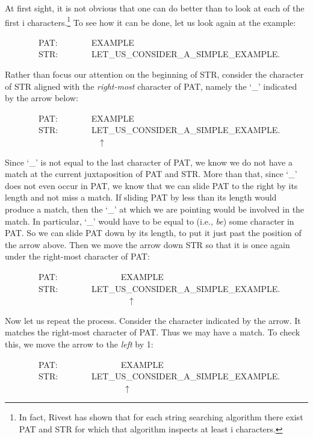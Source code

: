 \documentclass[10pt]{book}
\newenvironment{pubasis}{\begin{flushleft}}{\end{flushleft}}
\begin{document}
At first sight, it is not obvious that one can do better than to look at
each of the first i characters.\footnote{In fact, Rivest \cite{RIVEST} has shown that for each string searching algorithm there exist PAT and STR for which that algorithm inspects at least i characters.}
To see how it can be done, let us look again
at the example:
\begin{pubasis}
~~~~~~~~PAT:~~~~~~~~EXAMPLE\\
~~~~~~~~STR:~~~~~~~~LET\_US\_CONSIDER\_A\_SIMPLE\_EXAMPLE.\\
\end{pubasis}
Rather than focus our attention on the beginning of STR, consider
the character of STR aligned with the \emph{right-most} character of PAT,
namely the `\_' indicated by the arrow below:
\begin{pubasis}
~~~~~~~~PAT:~~~~~~~~EXAMPLE\\
~~~~~~~~STR:~~~~~~~~LET\_US\_CONSIDER\_A\_SIMPLE\_EXAMPLE.\\
~~~~~~~~~~~~~~~~~~~~~~$\uparrow$\\
\end{pubasis}
Since `\_' is not equal to the last character of PAT, we know we do not have
a match at the current juxtaposition of PAT and STR.  More than
that, since `\_' does not even occur in PAT, we know that we can slide
PAT to the right by its length and not miss a match.  If sliding PAT by
less than its length would produce a match, then the `\_' at which we
are pointing would be involved in the match.  In particular, `\_' would
have to be equal to (i.e., \emph{be}) some character
in PAT.  So we can slide PAT down by its length, to put it
just past the position of the arrow above.  Then we move the arrow down STR so that it
is once again under the right-most character of PAT:
\begin{pubasis}
~~~~~~~~PAT:~~~~~~~~~~~~~~~EXAMPLE\\
~~~~~~~~STR:~~~~~~~~LET\_US\_CONSIDER\_A\_SIMPLE\_EXAMPLE.\\
~~~~~~~~~~~~~~~~~~~~~~~~~~~~~$\uparrow$\\
\end{pubasis}
Now let us repeat the process.  Consider the character indicated by the
arrow.  It matches the right-most character of PAT.  Thus we may have a match.
To check this, we move the arrow to the \emph{left} by 1:
\begin{pubasis}
~~~~~~~~PAT:~~~~~~~~~~~~~~~EXAMPLE\\
~~~~~~~~STR:~~~~~~~~LET\_US\_CONSIDER\_A\_SIMPLE\_EXAMPLE.\\
~~~~~~~~~~~~~~~~~~~~~~~~~~~~$\uparrow$\\
\end{pubasis}
\end{document}
